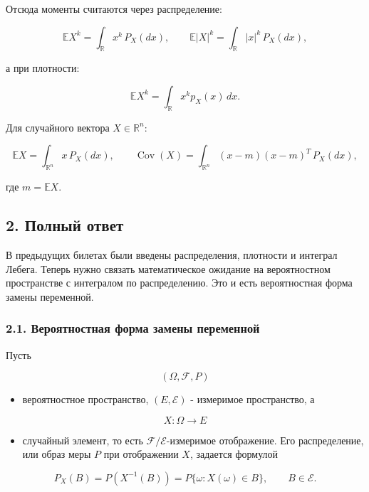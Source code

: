 \documentclass[
  11pt,
  a4paper,
]{article}
\providecommand{\tightlist}{%
  \setlength{\itemsep}{0pt}\setlength{\parskip}{0pt}}
\begin{document}
Отсюда моменты считаются через распределение:

\[
\mathbb EX^k=\int_{\mathbb R} x^k\,P_X(dx),
\qquad
\mathbb E|X|^k=\int_{\mathbb R} |x|^k\,P_X(dx),
\]

а при плотности:

\[
\mathbb EX^k=\int_{\mathbb R} x^k p_X(x)\,dx.
\]

Для случайного вектора \(X\in\mathbb R^n\):

\[
\mathbb EX=\int_{\mathbb R^n}x\,P_X(dx),
\qquad
\operatorname{Cov}(X)=\int_{\mathbb R^n}(x-m)(x-m)^T\,P_X(dx),
\]

где \(m=\mathbb EX\).

\subsection{2. Полный
ответ}\label{ux43fux43eux43bux43dux44bux439-ux43eux442ux432ux435ux442}

В предыдущих билетах были введены распределения, плотности и интеграл
Лебега. Теперь нужно связать математическое ожидание на вероятностном
пространстве с интегралом по распределению. Это и есть вероятностная
форма замены переменной.

\subsubsection{2.1. Вероятностная форма замены
переменной}\label{ux432ux435ux440ux43eux44fux442ux43dux43eux441ux442ux43dux430ux44f-ux444ux43eux440ux43cux430-ux437ux430ux43cux435ux43dux44b-ux43fux435ux440ux435ux43cux435ux43dux43dux43eux439}

Пусть

\[
(\Omega,\mathcal F,P)
\]

\begin{itemize}
\tightlist
\item
  вероятностное пространство, \((E,\mathcal E)\) - измеримое
  пространство, а
\end{itemize}

\[
X:\Omega\to E
\]

\begin{itemize}
\tightlist
\item
  случайный элемент, то есть \(\mathcal F/\mathcal E\)-измеримое
  отображение. Его распределение, или образ меры \(P\) при отображении
  \(X\), задается формулой
\end{itemize}

\[
P_X(B)=P(X^{-1}(B))=P\{\omega:X(\omega)\in B\},
\qquad B\in\mathcal E.
\]
\end{document}
